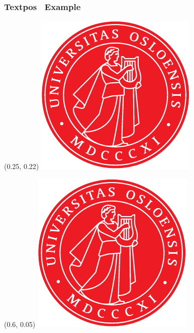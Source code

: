 \documentclass[UKenglish, unknownkeysallowed]{beamer}
\begin{document}
\begin{frame}
    \frametitle{Textpos \textthreequartersemdash\ Example}

    \begin{textblock}{0.3}(0.25, 0.22)
        \includegraphics[width = \textwidth]{apollon}
    \end{textblock}

    \begin{textblock}{0.3}(0.6, 0.05)
        \includegraphics[width = \textwidth]{apollon}
    \end{textblock}


\end{frame}
\end{document}
